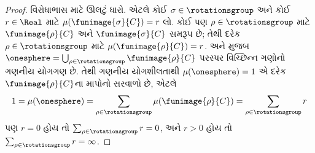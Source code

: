 \begin{proof}
વિરોધાભાસ માટે ઊલટું ધારો.
એટલે કોઈ $\sigma \in
\rotationsgroup$ અને કોઈ
$r \in \Real$ માટે
$\mu(\funimage{\sigma}{C}) = r$
લો. કોઈ પણ $\rho \in
\rotationsgroup$ માટે
$\funimage{\rho}{C}$ અને
$\funimage{\sigma}{C}$ સમરૂપ
છે; તેથી દરેક $\rho \in
\rotationsgroup$ માટે
$\mu(\funimage{\rho}{C}) = r$.
 અને
 મુજબ
$\onesphere = \bigcup_{\rho \in
\rotationsgroup}\funimage{\rho}{C}$
પરસ્પર વિચ્છિન્ન ગણોનો
ગણનીય યોગગણ છે. તેથી
ગણનીય યોગશીલતાથી
$\mu(\onesphere) = 1$ એ
દરેક $\funimage{\rho}{C}$ના
માપોનો સરવાળો છે, એટલે
\[
	1 = \mu(\onesphere) = \sum_{\rho \in \rotationsgroup}\mu(\funimage{\rho}{C}) = \sum_{\rho \in \rotationsgroup}r
\]
પણ $r = 0$ હોય તો
$\sum_{\rho \in \rotationsgroup}r = 0$,
અને $r > 0$ હોય તો
$\sum_{\rho \in \rotationsgroup}r = \infty$.
\end{proof}
\endgroup


\OLEndChapterHook
\endgroup
